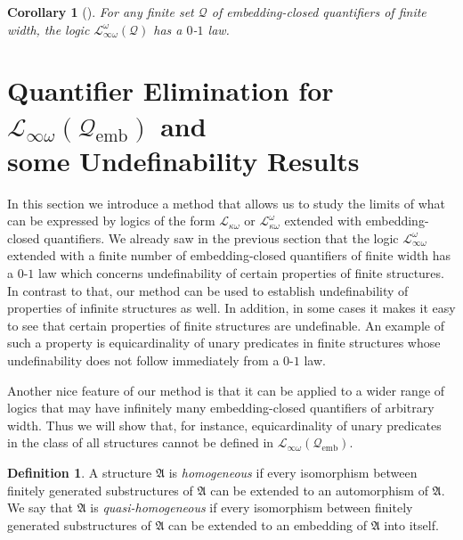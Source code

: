 \documentclass{ndjflart}
\theoremstyle{plain}
\newtheorem{corollary}[conjecture]{Corollary}
\theoremstyle{definition}
\newtheorem{definition}[conjecture]{Definition}
\numberwithin{equation}{section}
\DeclareMathOperator{\emb}{emb}
\begin{document}
\begin{corollary}[\cite{Dawar:2010}]
For any finite set $\mathcal{Q}$ of embedding-closed quantifiers of finite width,
the logic $\mathcal{L}^{\omega}_{\infty\omega}(\mathcal{Q})$ has a $0$-$1$ law.
\end{corollary}



\section{Quantifier Elimination for $\mathcal{L}_{\infty \omega}(\mathcal{Q}_{\emb})$ and \\ some Undefinability Results}\label{chain_section}

In this section we introduce a method that allows us to study the limits of what can be expressed by logics of the form $\mathcal{L}_{\kappa\omega}$ or $\mathcal{L}^{\omega}_{\kappa\omega}$ extended with embedding-closed quantifiers.
We already saw in the previous section that the logic $\mathcal{L}_{\infty\omega}^{\omega}$ extended with a finite number of embedding-closed quantifiers of finite width has a $0$-$1$ law
which concerns undefinability of certain properties of finite structures.
In contrast to that, our method can be used to establish undefinability of properties of infinite structures as well. In addition, in some cases it makes it easy to see that certain properties of finite structures are undefinable.
An example of such a property is equicardinality of unary predicates in finite structures whose undefinability does not follow immediately from a $0$-$1$ law.

Another nice feature of our method is that it can
be applied to
a wider range of logics that may have infinitely many embedding-closed quantifiers
of arbitrary width.
Thus we will show that, for instance, equicardinality of unary predicates in the class of all structures cannot be defined in $\mathcal{L}_{\infty \omega}(\mathcal{Q}_{\emb})$.

\begin{definition}
A structure $\mathfrak{A}$ is \emph{homogeneous} if every isomorphism between finitely generated substructures of $\mathfrak{A}$ can be extended to an automorphism of $\mathfrak{A}$. We say that $\mathfrak{A}$ is \emph{quasi-homogeneous} if every isomorphism between finitely generated substructures of $\mathfrak{A}$ can be extended to an embedding of $\mathfrak{A}$ into itself.
\end{definition}
\end{document}
